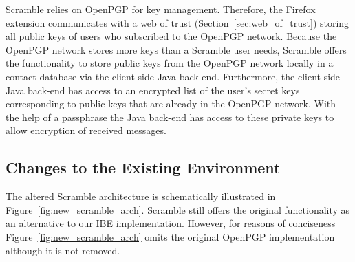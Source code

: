 Scramble relies on OpenPGP for key management. Therefore, the Firefox extension communicates with a web of trust (Section~\ref{sec:web_of_trust}) storing all public keys of users who subscribed to the OpenPGP network. Because the OpenPGP network stores more keys than a Scramble user needs, Scramble offers the functionality to store public keys from the OpenPGP network locally in a contact database via the client side Java back-end. Furthermore, the client-side Java back-end has access to an encrypted list of the user's secret keys corresponding to public keys that are already in the OpenPGP network. With the help of a passphrase the Java back-end has access to these private keys to allow encryption of received messages.

\subsection{Changes to the Existing Environment}
The altered Scramble architecture is schematically illustrated in Figure~\ref{fig:new_scramble_arch}. Scramble still offers the original functionality as an alternative to our IBE implementation. However, for reasons of conciseness Figure~\ref{fig:new_scramble_arch} omits the original OpenPGP implementation although it is not removed.



